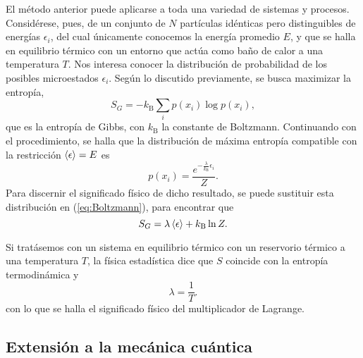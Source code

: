 El método anterior puede aplicarse a toda una variedad de sistemas y procesos. Considérese, pues, de un conjunto de $N$ partículas idénticas pero distinguibles de energías $\epsilon_{i}$, del cual únicamente conocemos la energía promedio $E$, y que se halla en equilibrio térmico con un entorno que actúa como baño de calor a una temperatura $T$. Nos interesa conocer la distribución de probabilidad de los posibles microestados $\epsilon_{i}$. Según lo discutido previamente, se busca maximizar la entropía,
\begin{equation}\label{eq:GibbsEntropy}
    S_{G}=-k_{\text{B}}\sum_{i}p(x_{i})\log{p(x_{i})},
\end{equation}
que es la entropía de Gibbs, con $k_{\text{B}}$ la constante de Boltzmann. Continuando con el procedimiento, se halla que la distribución de máxima entropía compatible con la restricción $\expval{\epsilon}=E$ es
\begin{equation}\label{eq:Boltzmann}
    p(x_{i})=\frac{e^{-\frac{\lambda}{k_{\text{B}}}\epsilon_{i}}}{Z}.
\end{equation}
Para discernir el significado físico de dicho resultado, se puede sustituir esta distribución en (\ref{eq:Boltzmann}), para encontrar que
\begin{equation}
    S_{G}=\lambda\expval{\epsilon}+k_{\text{B}}\ln{Z}.
\end{equation}

Si tratásemos con un sistema en equilibrio térmico con un reservorio térmico a una temperatura $T$, la física estadística dice que $S$ coincide con la entropía termodinámica y
\begin{equation}
    \lambda=\frac{1}{T}.\nonumber
\end{equation}
con lo que se halla el significado físico del multiplicador de Lagrange. \cite{Greiner}

\subsection{Extensión a la mecánica cuántica}


